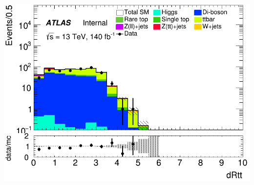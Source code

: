 \documentclass[usenames,dvipsnames]{beamer}
\begin{document}
\begin{frame}
\begin{minipage}{0.32\textwidth}
        \includegraphics[width=\textwidth]{graphics/LLH_met/LLH_met_dRtt.png}
    \end{minipage}
\end{frame}
\end{document}
